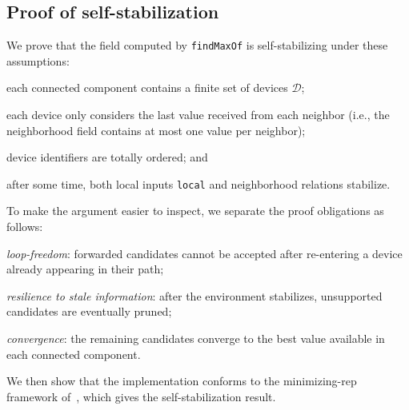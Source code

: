 \documentclass[runningheads]{llncs}
\newcommand{\ck}{\emph{Collektive}}
\newenvironment{inlinelist}{\begin{enumerate*}[label=\emph{(\roman*)}]}{\end{enumerate*}}
\begin{document}
%
%
%
%

\subsection{Proof of self-stabilization}
\label{subsec:proof}

We prove that the field computed by \lstinline|findMaxOf| is self-stabilizing under these assumptions:
\begin{inlinelist}
    \item each connected component contains a finite set of devices $\mathcal D$;
    \item each device only considers the last value received from each neighbor
    (i.e., the neighborhood field contains at most one value per neighbor);
    \item device identifiers are totally ordered; and
    \item after some time, both local inputs \lstinline|local| and neighborhood relations stabilize.
\end{inlinelist}
%
To make the argument easier to inspect, we separate the proof obligations as follows:
\begin{inlinelist}
    \item \emph{loop-freedom}: forwarded candidates cannot be accepted after re-entering a device already appearing in their path;
    \item \emph{resilience to stale information}: after the environment stabilizes, unsupported candidates are eventually pruned;
    \item \emph{convergence}: the remaining candidates converge to the best value available in each connected component.
\end{inlinelist}
%
We then show that the implementation conforms to the minimizing-rep framework of~\cite[\S5.2.2]{DBLP:journals/tomacs/ViroliABDP18},
which gives the self-stabilization result.
\end{document}

